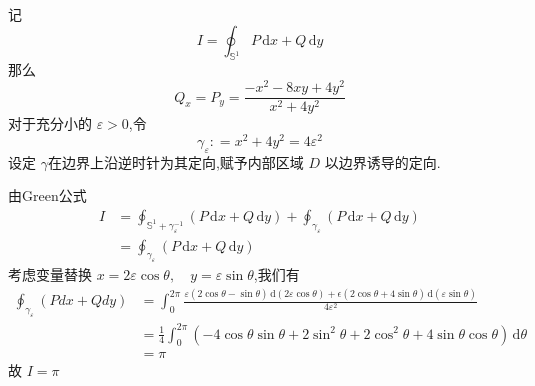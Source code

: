 \documentclass[lang=cn,12pt,color=green,fontset=none,thmcnt=section]{elegantbook}
\begin{document}
\begin{solution}
   记 $$
   I= \oint_{ \mathbb{S}^{1}} P \,\mathrm{d}x+  Q \,\mathrm{d}y 
   $$那么 $$
   Q_{x}= P_{y}= \frac{-x^{2}-8xy+ 4y^{2} }{x^{2}+ 4y^{2} } 
   $$对于充分小的 $ \varepsilon > 0 $,令  $$
   \gamma _{ \varepsilon} : = x^{2}+  4y^{2} = 4 \varepsilon^{2}
   $$ 设定 $ \gamma  $在边界上沿逆时针为其定向,赋予内部区域 $ D $ 以边界诱导的定向. 
\end{solution}
由Green公式 $$
\begin{aligned}
I& = \oint_{ \mathbb{S}^{1}+  \gamma_{\varepsilon}^{-1} }\left(  P \,\mathrm{d}x+  Q \,\mathrm{d}y  \right) +  \oint _{ \gamma _{ \varepsilon }} \left( P \,\mathrm{d}x +  Q \,\mathrm{d} y \right)  
\\ & = \oint_{ \gamma _{ \varepsilon}} \left( P \,\mathrm{d}x +  Q \,\mathrm{d} y \right) 
\end{aligned}
$$
考虑变量替换 $ x = 2\varepsilon \cos  \theta , \quad y= \varepsilon \sin  \theta $,我们有 $$
\begin{aligned}
    \oint _{ \gamma_{ \varepsilon }} \left( Pdx+  Qdy \right)  & = \int _{ 0}^{ 2\pi} \frac{ \varepsilon\left(  2\cos  \theta - \sin  \theta \right) \,\mathrm{d} \left( 2 \varepsilon \cos  \theta \right) +  \epsilon \left( 2\cos  \theta + 4\sin  \theta   \right) \,\mathrm{d} \left(  \varepsilon \sin  \theta \right)     }{4\varepsilon ^{2} } 
    \\& =\frac{1}{4} \int_{0}^{2\pi} \left( -4 \cos  \theta \sin  \theta +  2 \sin ^{2} \theta +  2 \cos  ^{2} \theta +  4 \sin  \theta \cos  \theta  \right) \,\mathrm{d} \theta 
    \\ & = \pi
\end{aligned} 
$$  故 $ I = \pi $ 


\chapter{}
\end{document}
